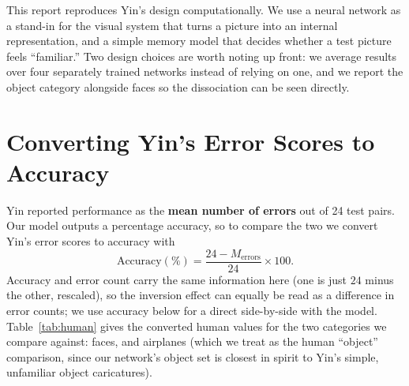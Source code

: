 \documentclass[11pt]{article}
\begin{document}
This report reproduces Yin's design computationally. We use a neural network as a stand-in
for the visual system that turns a picture into an internal representation, and a simple
memory model that decides whether a test picture feels ``familiar.'' Two design choices are
worth noting up front: we average results over four separately trained networks instead of
relying on one, and we report the object category alongside faces so the dissociation can be
seen directly.

\section{Converting Yin's Error Scores to Accuracy}

Yin reported performance as the \textbf{mean number of errors} out of 24 test pairs. Our
model outputs a percentage accuracy, so to compare the two we convert Yin's error scores to
accuracy with
\[
\text{Accuracy}(\%) = \frac{24 - M_{\text{errors}}}{24} \times 100 .
\]
Accuracy and error count carry the same information here (one is just $24$ minus the other,
rescaled), so the inversion effect can equally be read as a difference in error counts; we
use accuracy below for a direct side-by-side with the model. Table~\ref{tab:human} gives the
converted human values for the two categories we compare against: faces, and airplanes
(which we treat as the human ``object'' comparison, since our network's object set is closest
in spirit to Yin's simple, unfamiliar object caricatures).
\end{document}
